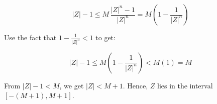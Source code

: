 \documentclass{ximera}
\begin{document}
\begin{question}
\begin{problem}
\[ |Z| - 1 \leq M \, \frac{|Z|^{n} - 1}{|Z|^n} = M \left( 1 - \frac{1}{|Z|^n} \right) \]
\end{problem}

\begin{problem}
    Use the fact that $1 - \frac{1}{|Z|^n} < 1$ to get:  

\[ |Z| - 1 \leq  M \left( 1 - \frac{1}{|Z|^n} \right)  < M (1) = M\]
\end{problem}

\begin{problem}
     From $|Z| - 1 < M$, we get $|Z| < M+1$.  Hence, $Z$ lies in the interval  $\left[-(M+1), M+1\right]$.
\end{problem}


\end{question} 
\end{document}
